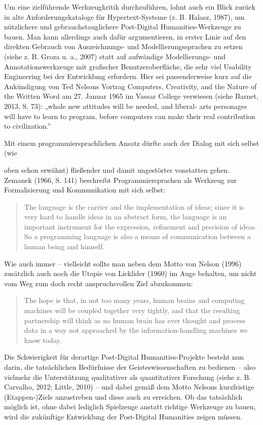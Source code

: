 \documentclass[a4paper,
fontsize=11pt,
oneside,
numbers=noperiodatend,
parskip=half-,
bibliography=totoc,
final
]{scrartcl}
\begin{document}
Um eine zielführende Werkzeugkritik durchzuführen, lohnt auch ein Blick
zurück in alte Anforderungskataloge für Hypertext-Systeme (z. B. Halasz,
1987), um nützlichere und gebrauchstauglichere Post-Digital
Humanities-Werkzeuge zu bauen. Man kann allerdings auch dafür
argumentieren, in erster Linie auf den direkten Gebrauch von
Auszeichnungs- und Modellierungssprachen zu setzen (siehe z. B. Groza u.
a., 2007) statt auf aufwändige Modellierungs- und Annotationswerkzeuge
mit grafischer Benutzeroberfläche, die sehr viel Usability Engineering
bei der Entwicklung erfordern. Hier sei passenderweise kurz auf die
Ankündigung von Ted Nelsons Vortrag Computers, Creativity, and the
Nature of the Written Word am 27. Januar 1965 im Vassar College
verwiesen (siehe Barnet, 2013, S. 73): „whole new attitudes will be
needed, and liberal- arts personages will have to learn to program,
before computers can make their real contribution to civilization.''

Mit einem programmiersprachlichen Ansatz dürfte auch der Dialog mit sich
selbst (wie

oben schon erwähnt) fließender und damit ungestörter vonstatten gehen.
Zemanek (1966, S. 141) beschreibt Programmiersprachen als Werkzeug zur
Formalisierung und Kommunikation mit sich selbst:

\begin{quote}
The language is the carrier and the implementation of ideas; since it is
very hard to handle ideas in an abstract form, the language is an
important instrument for the expression, refinement and precision of
ideas. So a programming language is also a means of communication
between a human being and himself.
\end{quote}

Wie auch immer -- vielleicht sollte man neben dem Motto von Nelson
(1996) zusätzlich auch noch die Utopie von Licklider (1960) im Auge
behalten, um nicht vom Weg zum doch recht anspruchsvollen Ziel
abzukommen:

\begin{quote}
The hope is that, in not too many years, human brains and computing
machines will be coupled together very tightly, and that the resulting
partnership will think as no human brain has ever thought and process
data in a way not approached by the information-handling machines we
know today.
\end{quote}

Die Schwierigkeit für derartige Post-Digital Humanities-Projekte besteht
nun darin, die tatsächlichen Bedürfnisse der Geisteswissenschaften zu
bedienen -- also vielmehr die Unterstützung qualitativer als
quantitativer Forschung (siehe z. B. Carvalho, 2012; Little, 2010) --
und dabei gemäß dem Motto Nelsons kurzfristige (Etappen-)Ziele
anzustreben und diese auch zu erreichen. Ob das tatsächlich möglich ist,
ohne dabei lediglich Spielzeuge anstatt richtige Werkzeuge zu bauen,
wird die zukünftige Entwicklung der Post-Digital Humanities zeigen
müssen.
\end{document}
